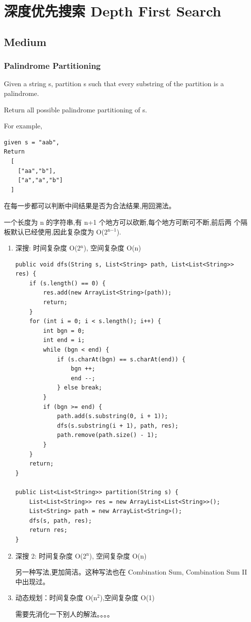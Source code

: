 \documentclass[12pt]{book}
\begin{document}
\chapter{深度优先搜索 Depth First Search}
\label{sec-11}
\section{Medium}
\label{sec-11-1}
\subsection{Palindrome Partitioning}
\label{sec-11-1-1}
Given a string s, partition s such that every substring of the partition is a palindrome.

Return all possible palindrome partitioning of s.

For example, 
\lstset{language=java,label= ,caption= ,numbers=none}
\begin{lstlisting}
given s = "aab",
Return
  [
    ["aa","b"],
    ["a","a","b"]
  ]
\end{lstlisting}

在每一步都可以判断中间结果是否为合法结果,用回溯法。

一个长度为 n 的字符串,有 n+1 个地方可以砍断,每个地方可断可不断,前后两
个隔板默认已经使用,因此复杂度为 O(2$^{\text{n−1}}$).

\begin{enumerate}
\item 深搜: 时间复杂度 O(2$^{\text{n}}$), 空间复杂度 O(n)
\label{sec-11-1-1-1}
\lstset{language=java,label= ,caption= ,numbers=none}
\begin{lstlisting}
public void dfs(String s, List<String> path, List<List<String>> res) {
    if (s.length() == 0) {
        res.add(new ArrayList<String>(path));
        return;
    }
    for (int i = 0; i < s.length(); i++) {
        int bgn = 0;
        int end = i;
        while (bgn < end) {
            if (s.charAt(bgn) == s.charAt(end)) {
                bgn ++;
                end --;
            } else break;
        }
        if (bgn >= end) {
            path.add(s.substring(0, i + 1));
            dfs(s.substring(i + 1), path, res);
            path.remove(path.size() - 1);
        } 
    }
    return;
}

public List<List<String>> partition(String s) {
    List<List<String>> res = new ArrayList<List<String>>();
    List<String> path = new ArrayList<String>();
    dfs(s, path, res);
    return res;
}
\end{lstlisting}

\item 深搜 2: 时间复杂度 O(2$^{\text{n}}$), 空间复杂度 O(n)
\label{sec-11-1-1-2}

另一种写法,更加简洁。这种写法也在 Combination Sum, Combination Sum II 中出现过。

\item 动态规划：时间复杂度 O(n$^{\text{2}}$),空间复杂度 O(1)
\label{sec-11-1-1-3}

需要先消化一下别人的解法。。。。
\end{enumerate}
\end{document}
